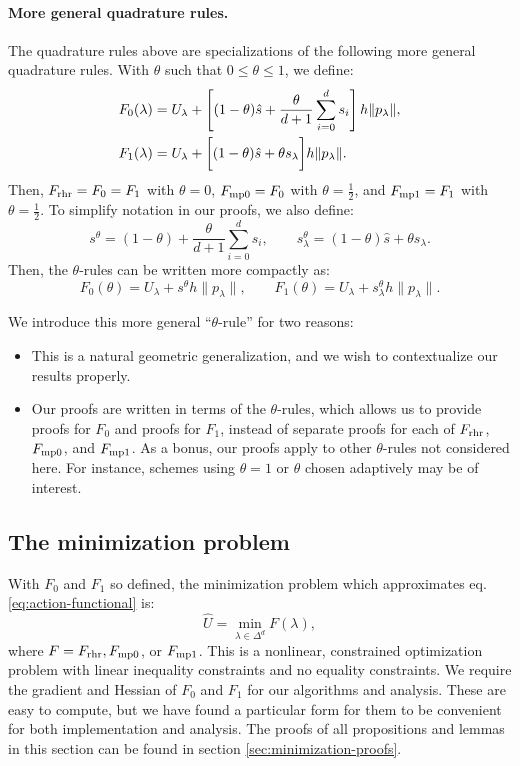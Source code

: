 \documentclass[smallcondensed]{svjour3}
\begin{document}
\paragraph{More general quadrature rules.} The quadrature rules above
are specializations of the following more general quadrature
rules. With $\theta$ such that $0 \leq \theta \leq 1$, we define:
\begin{align}
  F_0(\lambda) &= U_\lambda + \left[(1 - \theta)\hat{s} + \frac{\theta}{d+1} \sum_{i=0}^d s_i\right] h \|p_\lambda\|, \\
  F_1(\lambda) &= U_\lambda + \bigg[ (1 - \theta)\hat{s} + \theta s_\lambda \bigg] h \|p_\lambda\|.
\end{align}
Then, $F_{\operatorname{rhr}} = F_0 = F_1$ with $\theta = 0$, $F_{\operatorname{mp0}} = F_0$ with
$\theta = \tfrac{1}{2}$, and $F_{\operatorname{mp1}} = F_1$ with
$\theta = \tfrac{1}{2}$. To simplify notation in our proofs, we also
define:
\begin{equation}
  s^\theta = {(1 - \theta)} + \frac{\theta}{d + 1} \sum_{i=0}^d s_i, \qquad s^\theta_\lambda = (1 - \theta) \hat{s} + \theta s_\lambda.
\end{equation}
Then, the $\theta$-rules can be written more compactly as:
\begin{equation}
  F_0(\theta) = U_\lambda + s^\theta h \|p_\lambda\|, \qquad F_1(\theta) = U_\lambda + s^\theta_\lambda h \|p_\lambda\|.
\end{equation}

We introduce this more general
``$\theta$-rule'' for two reasons:
\begin{itemize}
\item This is a natural geometric generalization, and we wish
  to contextualize our results properly.
\item Our proofs are written in terms of the $\theta$-rules, which
  allows us to provide proofs for $F_0$ and proofs for $F_1$, instead
  of separate proofs for each of $F_{\operatorname{rhr}}$, $F_{\operatorname{mp0}}$, and
  $F_{\operatorname{mp1}}$. As a bonus, our proofs apply to other $\theta$-rules not
  considered here. For instance, schemes using $\theta = 1$ or
  $\theta$ chosen adaptively may be of interest.
\end{itemize}

\subsection{The minimization problem}\label{ssec:minimization-problem}

With $F_0$ and $F_1$ so defined, the minimization problem which
approximates eq.\@ \ref{eq:action-functional} is:
\begin{equation}
  \label{eq:constrained-minimization}
  \hat{U} = \min_{\lambda \in \Delta^d} F(\lambda),
\end{equation}
where $F = F_{\operatorname{rhr}}, F_{\operatorname{mp0}}$, or $F_{\operatorname{mp1}}$. This is a nonlinear,
constrained optimization problem with linear inequality constraints
and no equality constraints. We require the gradient and Hessian of
$F_0$ and $F_1$ for our algorithms and analysis. These are easy to
compute, but we have found a particular form for them to be convenient
for both implementation and analysis. The proofs of all propositions
and lemmas in this section can be found in section\@
\ref{sec:minimization-proofs}.
\end{document}
